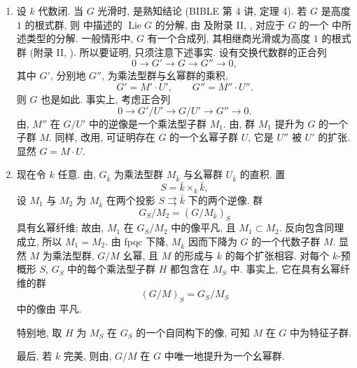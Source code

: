 \begin{enumerate}
\item[(i)] 设 \(k\) 代数闭.
当 \(G\) 光滑时,  是熟知结论
(BIBLE 第 4 讲, 定理 4).
若 \(G\) 是高度 \(1\) 的根式群,
则 中描述的 \(\operatorname{Lie}G\) 的分解,
由
及附录 II, ,
对应于 \(G\) 的一个 中所述类型的分解.
一般情形中, \(G\) 有一个合成列, 其相继商光滑或为高度 \(1\) 的根式群
(附录 II, ).
所以要证明, 只须注意下述事实.
设有交换代数群的正合列
  \[
    0\longrightarrow G'\longrightarrow G\longrightarrow
    G''\longrightarrow0,
  \]
其中 \(G'\), 分别地 \(G''\), 为乘法型群与幺幂群的乘积,
  \[
    G'=M'\cdot U',\qquad G''=M''\cdot U''.
  \]
则 \(G\) 也是如此. 事实上, 考虑正合列
  \[
    0\longrightarrow G'/U'\longrightarrow G/U'
      \longrightarrow G''\longrightarrow0.
  \]
由,
\(M''\) 在 \(G/U'\) 中的逆像是一个乘法型子群 \(M_1\).
由,
群 \(M_1\) 提升为 \(G\) 的一个子群 \(M\).
同样, 改用,
可证明存在 \(G\) 的一个幺幂子群 \(U\), 它是 \(U''\) 被 \(U'\) 的扩张.
显然 \(G=M\cdot U\).

\item[(ii)] 现在令 \(k\) 任意.
由,
\(G_{\bar k}\) 为乘法型群 \(M_{\bar k}\) 与幺幂群 \(U_{\bar k}\) 的直积. 置
  \[
    S=\bar k\times_k\bar k,
  \]
设 \(M_1\) 与 \(M_2\) 为 \(M_{\bar k}\) 在两个投影
\(S\rightrightarrows\bar k\) 下的两个逆像. 群
  \[
    G_S/M_2=(G/M_{\bar k})_S
  \]
具有幺幂纤维; 故由,
\(M_1\) 在 \(G_S/M_2\) 中的像平凡, 且 \(M_1\subset M_2\).
反向包含同理成立, 所以 \(M_1=M_2\).
由 fpqc 下降, \(M_{\bar k}\) 因而下降为 \(G\) 的一个代数子群 \(M\).
显然 \(M\) 为乘法型群, \(G/M\) 幺幂, 且 \(M\) 的形成与 \(k\) 的每个扩张相容.
对每个 \(k\)-预概形 \(S\), \(G_S\) 中的每个乘法型子群 \(H\) 都包含在 \(M_S\) 中.
事实上, 它在具有幺幂纤维的群
  \[
    (G/M)_S=G_S/M_S
  \]
中的像由 平凡.

特别地, 取 \(H\) 为 \(M_S\) 在 \(G_S\) 的一个自同构下的像,
可知 \(M\) 在 \(G\) 中为特征子群.

最后, 若 \(k\) 完美, 则由,
\(G/M\) 在 \(G\) 中唯一地提升为一个幺幂群.
\end{enumerate}

